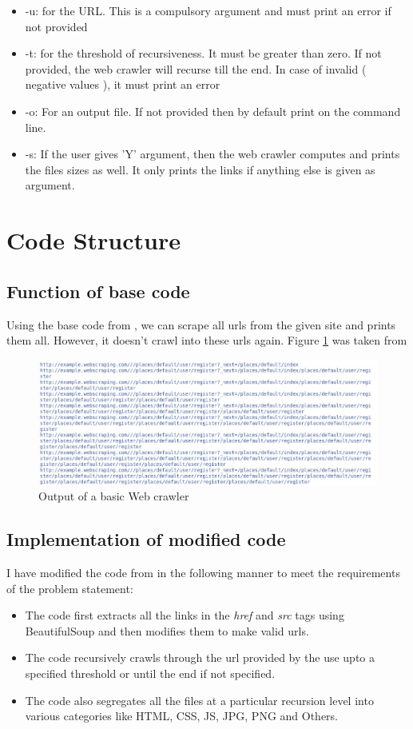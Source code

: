 \documentclass{article}
\begin{document}
\begin{itemize}
    \item -u: for the URL. This is a compulsory argument and must print an error if not provided
    \item -t: for the threshold of recursiveness. It must be greater than zero. If not provided, the web crawler will recurse till the end. In case of invalid ( negative values ), it must print an error
    \item -o: For an output file. If not provided then by default print on the command line.
    \item -s: If the user gives 'Y' argument, then the web crawler computes and prints the files sizes as well. It only prints the links if anything else is given as argument.
\end{itemize}
\section*{Code Structure}
\subsection*{Function of base code}
Using the base code from \cite{2}, we can scrape all urls from the given site and prints them all. However, it doesn't crawl into these urls again. Figure \ref{fig:Design1} was taken from \cite{2}
\begin{figure}[H]
    \centering
    \includegraphics[scale=0.4]{Screenshot.jpeg}
    \caption{Output of a basic Web crawler}
    \label{fig:Design1}
\end{figure}
\subsection*{Implementation of modified code}
I have modified the code from \cite{2} in the following manner to meet the requirements of the problem statement:
\begin{itemize}
    
    \item The code first extracts all the links in the \textit{href} and \textit{src} tags using BeautifulSoup and then modifies them to make valid urls. 
    \item The code recursively crawls through the url provided by the use upto a specified threshold or until the end if not specified.
    \item  The code also segregates all the files at a particular recursion level into various categories like HTML, CSS, JS, JPG, PNG and Others.
\end{itemize}
\end{document}

